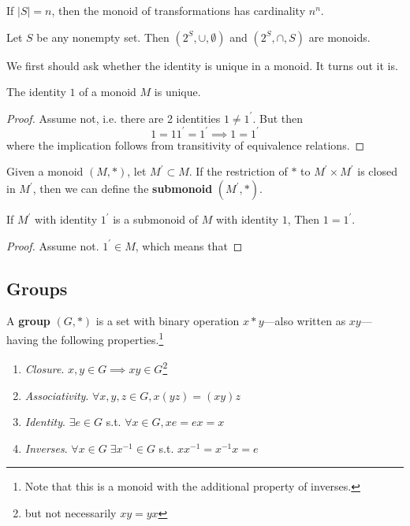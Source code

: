   \begin{theorem}
    If $|S| = n$, then the monoid of transformations has cardinality $n^n$. 
  \end{theorem}

  \begin{example}
    Let $S$ be any nonempty set. Then $(2^S, \cup, \emptyset)$ and $(2^S, \cap, S)$ are monoids. 
  \end{example}

  We first should ask whether the identity is unique in a monoid. It turns out it is. 

  \begin{lemma}
    The identity $1$ of a monoid $M$ is unique. 
  \end{lemma}
  \begin{proof}
    Assume not, i.e. there are 2 identities $1 \neq 1^\prime$. But then 
    \begin{equation}
      1 = 1 1^\prime = 1^\prime \implies 1 = 1^\prime
    \end{equation}
    where the implication follows from transitivity of equivalence relations. 
  \end{proof} 

  \begin{definition}[Submonoid]
    Given a monoid $(M, \ast)$, let $M^\prime \subset M$. If the restriction of $\ast$ to $M^\prime \times M^\prime$ is closed in $M^\prime$, then we can define the \textbf{submonoid} $(M^\prime, \ast)$. 
  \end{definition} 

  \begin{theorem}
    If $M^\prime$ with identity $1^\prime$ is a submonoid of $M$ with identity $1$, Then $1 = 1^\prime$. 
  \end{theorem}
  \begin{proof}
    Assume not. $1^\prime \in M$, which means that 
  \end{proof}

\subsection{Groups}

  \begin{definition}[Group]
    A \textbf{group} $(G, \ast)$ is a set with binary operation $x \ast y$---also written as $xy$---having the following properties.\footnote{Note that this is a monoid with the additional property of inverses.}
    \begin{enumerate}
      \item \textit{Closure}. $x, y \in G \implies xy \in G$\footnote{but not necessarily $xy  = yx$}
      \item \textit{Associativity}. $\forall x, y, z \in G, x(yz) = (xy)z$
      \item \textit{Identity}. $\exists e \in G$ s.t. $\forall x \in G, xe = ex = x$
      \item \textit{Inverses}. $\forall x \in G \; \exists x^{-1} \in G$ s.t. $x x^{-1} = x^{-1} x = e$
    \end{enumerate}
  \end{definition} 

